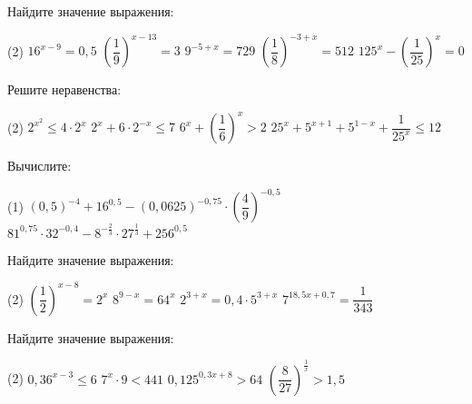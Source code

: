 \begin{class}[number=2]
\begin{listofex}
		\item Найдите значение выражения:
		\begin{tasks}(2)
			\task \( 16^{x-9}=0,5 \) %
			\task \( \left( \dfrac{1}{9} \right)^{x-13}=3  \) %
			\task \( 9^{-5+x}=729 \) %
			\task \( \left( \dfrac{1}{8} \right)^{-3+x}=512 \) %
			\task \( 125^x - \left( \dfrac{1}{25} \right)^x = 0  \) %
		\end{tasks}
		\item Решите неравенства:
		\begin{tasks}(2)
			\task \( 2^{x^2} \le 4 \cdot 2^x \) %
			\task \( 2^x + 6 \cdot 2^{-x} \le 7 \) %
			\task \( 6^x+\left( \dfrac{1}{6} \right)^x > 2  \) %
			\task \( 25^x + 5^{x+1}+5^{1-x} +  \dfrac{1}{25^x} \le 12 \) %
		\end{tasks}
	\end{listofex}
\end{class}

\begin{homework}[number=1]
	\begin{listofex}
		\item Вычислите: %
		\begin{tasks}(1)
			\task \( (0,5)^{-4} + 16^{0,5} - (0,0625)^{-0,75} \cdot \left( \dfrac{4}{9} \right)^{-0,5} \)
			\task \( 81^{0,75} \cdot 32^{-0,4} - 8^{-\tfrac{2}{3}}\cdot 27^{\tfrac{1}{3}}+256^{0,5} \)
			
		\end{tasks}
		\item Найдите значение выражения: %
		\begin{tasks}(2)
			\task \( \left( \dfrac{1}{2} \right)^{x-8}=2^x \)
			\task \( 8^{9-x}=64^x \)
			\task \( 2^{3+x}=0,4 \cdot 5^{3+x} \)
			\task \( 7^{18,5x+0,7}=\dfrac{1}{343} \)
		\end{tasks}
		\item Найдите значение выражения: %
		\begin{tasks}(2)
			\task \( 0,36^{x-3} \le 6 \)
			\task \( 7^{x} \cdot 9 < 441 \)
			\task \( 0,125^{0,3x+8} > 64 \)
			\task \( \left( \dfrac{8}{27} \right)^{\tfrac{1}{x}} > 1,5 \)
		\end{tasks}
	\end{listofex}
\end{homework}

